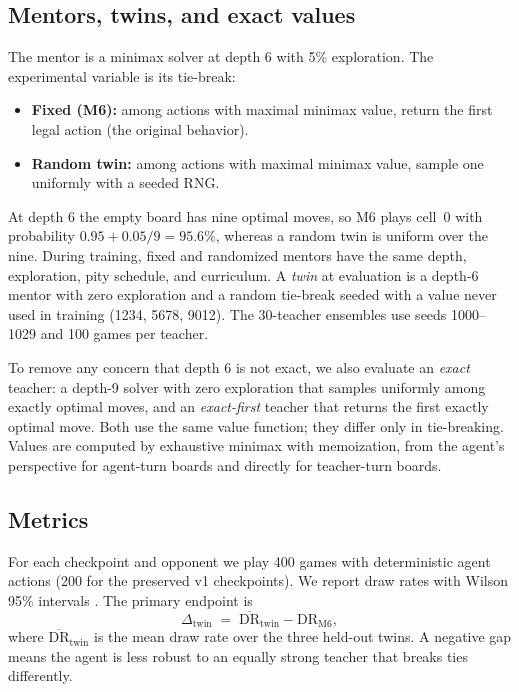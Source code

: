\documentclass[conference]{IEEEtran}
\newcommand{\DR}{\text{DR}}
\begin{document}
\subsection{Mentors, twins, and exact values}
The mentor is a minimax solver at depth 6 with 5\% exploration. The experimental variable is its tie-break:
\begin{itemize}
\item \textbf{Fixed (M6):} among actions with maximal minimax value, return the first legal action (the original behavior).
\item \textbf{Random twin:} among actions with maximal minimax value, sample one uniformly with a seeded RNG.
\end{itemize}
At depth 6 the empty board has nine optimal moves, so M6 plays cell~0 with probability $0.95+0.05/9=95.6\%$, whereas a random twin is uniform over the nine. During training, fixed and randomized mentors have the same depth, exploration, pity schedule, and curriculum. A \emph{twin} at evaluation is a depth-6 mentor with zero exploration and a random tie-break seeded with a value never used in training (1234, 5678, 9012). The 30-teacher ensembles use seeds 1000--1029 and 100 games per teacher.

To remove any concern that depth 6 is not exact, we also evaluate an \emph{exact} teacher: a depth-9 solver with zero exploration that samples uniformly among exactly optimal moves, and an \emph{exact-first} teacher that returns the first exactly optimal move. Both use the same value function; they differ only in tie-breaking. Values are computed by exhaustive minimax with memoization, from the agent's perspective for agent-turn boards and directly for teacher-turn boards.

\subsection{Metrics}
For each checkpoint and opponent we play 400 games with deterministic agent actions (200 for the preserved v1 checkpoints). We report draw rates with Wilson 95\% intervals \cite{wilson1927}. The primary endpoint is
\begin{equation}
\label{eq:gap}
\Delta_{\text{twin}} \;=\; \overline{\DR}_{\text{twin}} - \DR_{\text{M6}},
\end{equation}
where $\overline{\DR}_{\text{twin}}$ is the mean draw rate over the three held-out twins. A negative gap means the agent is less robust to an equally strong teacher that breaks ties differently.
\end{document}

